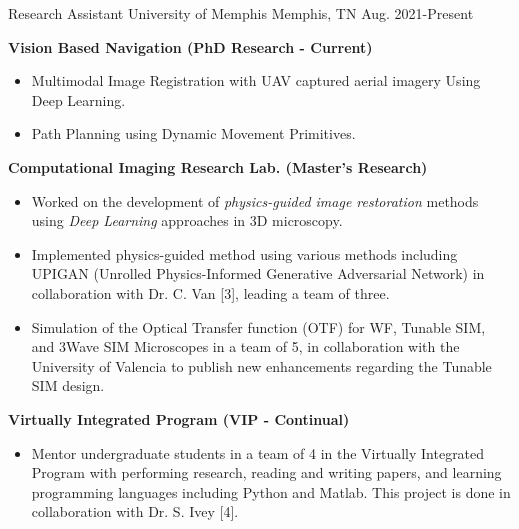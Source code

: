 

\begin{cventries}

  \cventry
    {Research Assistant} %
    {University of Memphis} %
    {Memphis, TN} %
    {Aug. 2021-Present} %
    {
      \begin{cvitems} %
      \item{\textbf{Vision Based Navigation (PhD Research - Current)}}
      \begin{itemize}[label= - ]
                \item Multimodal Image Registration with UAV captured aerial imagery Using Deep Learning.
                \item Path Planning using Dynamic Movement Primitives.
        \end{itemize}   
      \item{\textbf{Computational Imaging Research Lab. (Master's Research)}}
      \begin{itemize}[label= - ]
                \item{Worked on the development of \textit{physics-guided image restoration} methods using \textit{Deep Learning} approaches in 3D microscopy.}
                \item{Implemented physics-guided method using various methods including UPIGAN (Unrolled Physics-Informed Generative Adversarial Network) in collaboration with Dr. C. Van [3], leading a team of three.}
              \item{Simulation of the Optical Transfer function (OTF) for WF, Tunable SIM, and 3Wave SIM Microscopes in a team of 5, in collaboration with the University of Valencia to publish new enhancements regarding the Tunable SIM design.}
        \end{itemize}    
        \item{\textbf{Virtually Integrated Program (VIP - Continual)}}
        \begin{itemize}[label= - ]
              \item {Mentor undergraduate students in a team of 4 in the Virtually Integrated Program with performing research, reading and writing papers, and learning programming languages including Python and Matlab. This project is done in collaboration with Dr. S. Ivey [4].}

\end{itemize}
\end{cvitems}}
\end{cventries}
